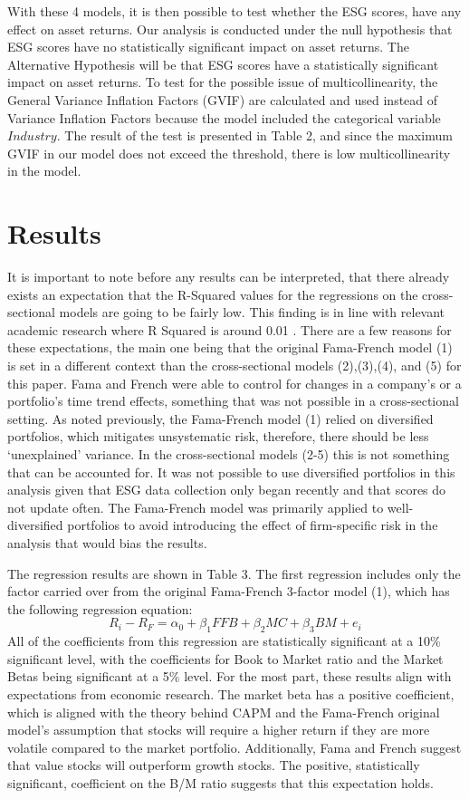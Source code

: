 \documentclass[man,natbib,floatsintext]{apa6}
\begin{document}
With these 4 models, it is then possible to test whether the ESG scores, have any effect on asset returns. Our analysis is conducted under the null hypothesis that ESG scores have no statistically significant impact on asset returns. The Alternative Hypothesis will be that ESG scores have a statistically significant impact on asset returns. To test for the possible issue of multicollinearity, the General Variance Inflation Factors (GVIF) are calculated and used instead of Variance Inflation Factors because the model included the categorical variable $Industry$. The result of the test is presented in Table 2, and since the maximum GVIF in our model does not exceed the threshold, there is low multicollinearity in the model. 


\section{\textbf{Results}}

It is important to note before any results can be interpreted, that there already exists an expectation that the R-Squared values for the regressions on the cross-sectional models are going to be fairly low. This finding is in line with relevant academic research where R Squared is around 0.01 \citep{fama_french_1993}. There are a few reasons for these expectations, the main one being that the original Fama-French model (1) is set in a different context than the cross-sectional models (2),(3),(4), and (5) for this paper. Fama and French were able to control for changes in a company’s or a portfolio’s time trend effects, something that was not possible in a cross-sectional setting. As noted previously, the Fama-French model (1) relied on diversified portfolios, which mitigates unsystematic risk, therefore, there should be less ‘unexplained’ variance. In the cross-sectional models (2-5) this is not something that can be accounted for. It was not possible to use diversified portfolios in this analysis given that ESG data collection only began recently and that scores do not update often. The Fama-French model was primarily applied to well-diversified portfolios to avoid introducing the effect of firm-specific risk in the analysis that would bias the results.

The regression results are shown in Table 3. The first regression includes only the factor carried over from the original Fama-French 3-factor model (1), which has the following regression equation:
$$R_i-R_F =\alpha_0+\beta_1 FFB+\beta_2 MC+\beta_3 BM+ e_i$$
All of the coefficients from this regression are statistically significant at a 10\% significant level, with the coefficients for Book to Market ratio and the Market Betas being significant at a 5\% level. For the most part, these results align with expectations from economic research. The market beta has a positive coefficient, which is aligned with the theory behind CAPM and the Fama-French original model's assumption that stocks will require a higher return if they are more volatile compared to the market portfolio. Additionally, Fama and French suggest that value stocks will outperform growth stocks. The positive, statistically significant, coefficient on the B/M ratio suggests that this expectation holds. 
\end{document}
